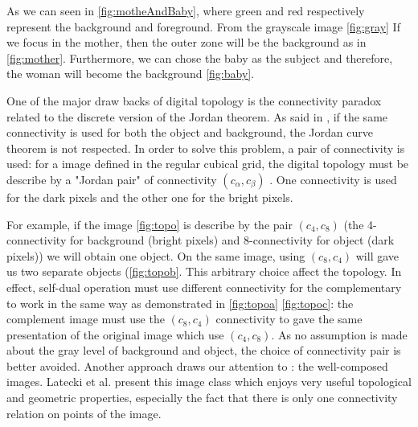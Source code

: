 \par
As we can seen in \ref{fig:motheAndBaby}, where green and red respectively represent the background and foreground. From the grayscale image \ref{fig:gray} If we focus in the mother, then the outer zone will be the background as in \ref{fig:mother}. Furthermore, we can chose the baby as the subject and therefore, the woman will become the background \ref{fig:baby}.	
\par
One of the major draw backs of digital topology is the connectivity paradox related to the discrete version of the Jordan theorem. As said in \cite{Kong:1989:DTI:71397.71400}, if the same connectivity is used for both the object and background, the Jordan curve theorem is not respected. In order to solve this problem, a pair of connectivity is used: for a image defined in the regular cubical grid, the digital topology must be describe by a "Jordan pair" of connectivity $(c_\alpha,c_\beta)$ . One connectivity is used for the dark pixels and the other one for the bright pixels. 
\par 
For example, if the image \ref{fig:topo} is describe by the pair $(c_4,c_8)$ (the 4-connectivity for background (bright pixels) and 8-connectivity for object (dark pixels)) we will obtain one object. On the same image, using $(c_8,c_4)$ will gave us two separate objects (\ref{fig:topob}. This arbitrary choice affect the topology. In effect, self-dual operation must use different connectivity for the complementary to work in the same way as demonstrated in \ref{fig:topoa} \ref{fig:topoc}: the complement image must use the $(c_8,c_4)$ connectivity to gave the same presentation of the original image which use $(c_4,c_8)$. As no assumption is made about the gray level of background and object, the choice of connectivity pair is better avoided. Another approach draws our attention to : the well-composed images. Latecki et al. \cite{Latecki95} present this image class which enjoys very useful topological and geometric properties, especially the fact that there is only one connectivity relation on points of the image.

